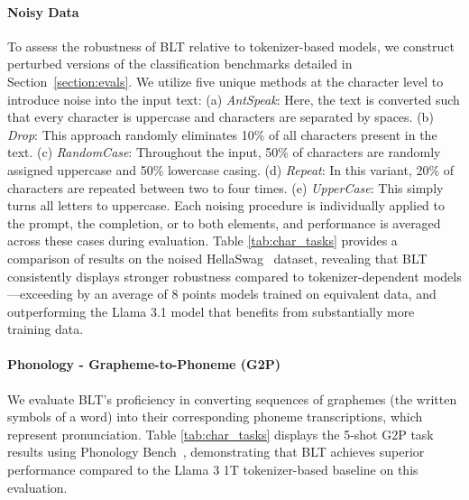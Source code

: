 \paragraph{Noisy Data} To assess the robustness of {\textsc BLT} relative to tokenizer-based models, we construct perturbed versions of the classification benchmarks detailed in Section~\ref{section:evals}. We utilize five unique methods at the character level to introduce noise into the input text: (a) \textit{AntSpeak}: Here, the text is converted such that every character is uppercase and characters are separated by spaces. (b) \textit{Drop}: This approach randomly eliminates 10\% of all characters present in the text. (c) \textit{RandomCase}: Throughout the input, 50\% of characters are randomly assigned uppercase and 50\% lowercase casing. (d) \textit{Repeat}: In this variant, 20\% of characters are repeated between two to four times. (e) \textit{UpperCase}: This simply turns all letters to uppercase. Each noising procedure is individually applied to the prompt, the completion, or to both elements, and performance is averaged across these cases during evaluation. Table \ref{tab:char_tasks} provides a comparison of results on the noised HellaSwag~\citep{Eval_hellaswag} dataset, revealing that {\textsc BLT} consistently displays stronger robustness compared to tokenizer-dependent models—exceeding by an average of 8 points models trained on equivalent data, and outperforming the Llama 3.1 model that benefits from substantially more training data.

\paragraph{Phonology - Grapheme-to-Phoneme (G2P)} We evaluate {\textsc BLT}'s proficiency in converting sequences of graphemes (the written symbols of a word) into their corresponding phoneme transcriptions, which represent pronunciation. Table \ref{tab:char_tasks} displays the 5-shot G2P task results using Phonology Bench~\citep{suvarna2024phonologybench}, demonstrating that {\textsc BLT} achieves superior performance compared to the Llama 3 1T tokenizer-based baseline on this evaluation.

